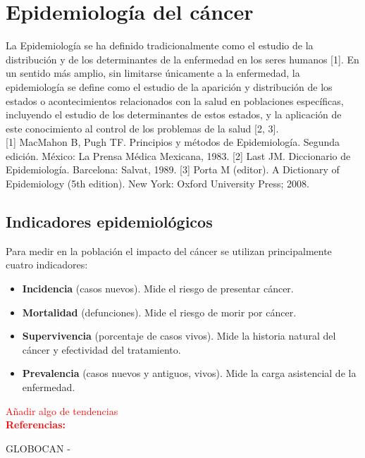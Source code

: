 \chapter{Epidemiología del cáncer}

La Epidemiología se ha definido tradicionalmente como el estudio de la distribución y de los determinantes de la enfermedad en los seres humanos [1]. En un sentido más amplio, sin limitarse únicamente a la enfermedad, la epidemiología se define como el estudio de la aparición y distribución de los estados o acontecimientos relacionados con la salud en poblaciones específicas, incluyendo el estudio de los determinantes de estos estados, y la aplicación de este conocimiento al control de los problemas de la salud [2, 3].\\

[1] MacMahon B, Pugh TF. Principios y métodos de Epidemiología. Segunda edición. México: La Prensa Médica Mexicana, 1983.
[2] Last JM. Diccionario de Epidemiología. Barcelona: Salvat, 1989.
[3] Porta M (editor). A Dictionary of Epidemiology (5th edition). New York: Oxford University Press; 2008.


\section{Indicadores epidemiológicos}

Para medir en la población el impacto del cáncer se utilizan principalmente cuatro indicadores:

\begin{itemize}
	\item \textbf{Incidencia} (casos nuevos). Mide el riesgo de presentar cáncer.
	\item \textbf{Mortalidad} (defunciones). Mide el riesgo de morir por cáncer.
	\item \textbf{Supervivencia} (porcentaje de casos vivos). Mide la historia natural del cáncer y efectividad del tratamiento.
	\item \textbf{Prevalencia} (casos nuevos y antiguos, vivos). Mide la carga asistencial de la enfermedad.
\end{itemize}

\textcolor{red}{Añadir algo de tendencias}\\


\textcolor{red}{\textbf{Referencias:}}

GLOBOCAN - \cite{Bray2018, GCO}

